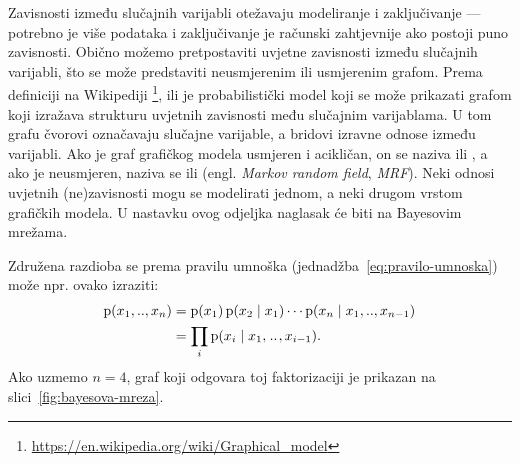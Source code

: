 \documentclass[utf8, diplomski, lmodern]{fer}
\begin{document}
Zavisnosti između slučajnih varijabli otežavaju modeliranje i zaključivanje --- potrebno je više podataka i zaključivanje je računski zahtjevnije ako postoji puno zavisnosti. Obično možemo pretpostaviti uvjetne zavisnosti između slučajnih varijabli, što se može predstaviti neusmjerenim ili usmjerenim grafom. Prema definiciji na Wikipediji \footnote{\url{https://en.wikipedia.org/wiki/Graphical_model}},  ili  je probabilistički model koji se može prikazati grafom koji izražava strukturu uvjetnih zavisnosti među slučajnim varijablama. U tom grafu čvorovi označavaju slučajne varijable, a bridovi izravne odnose između varijabli. Ako je graf grafičkog modela usmjeren i acikličan, on se naziva  ili , a ako je neusmjeren, naziva se  ili  (engl. \textit{Markov random field}, \textit{MRF}). Neki odnosi uvjetnih (ne)zavisnosti mogu se modelirati jednom, a neki drugom vrstom grafičkih modela. U nastavku ovog odjeljka naglasak će biti na Bayesovim mrežama.

Združena razdioba se prema pravilu umnoška (jednadžba~\eqref{eq:pravilo-umnoska}) može npr. ovako izraziti:
\begin{align}
\operatorname*{\mathrm{p}}(x_1,..,x_n) 
&= \operatorname*{\mathrm{p}}(x_1)\operatorname*{\mathrm{p}}(x_2\mid x_1)\cdots\operatorname*{\mathrm{p}}(x_n\mid x_1,..,x_{n-1}) \\
&= \prod_i\operatorname*{\mathrm{p}}(x_i\mid x_1,\mkern1.5mu{..}\mkern1.5mu,x_{i-1}) \text{.}
\label{eq:pgm-pravilo-umnoska}
\end{align} 
Ako uzmemo $n=4$, graf koji odgovara toj faktorizaciji je prikazan na slici~\ref{fig:bayesova-mreza}.
\end{document}
